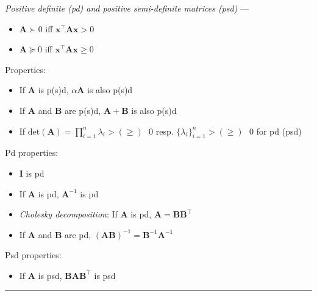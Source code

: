 \emph{Positive definite (pd) and positive semi-definite matrices (psd)} --- 
\begin{multicols}{2}
\begin{itemize}
    \item $\boldsymbol{A} \succ 0$ iff $\boldsymbol{x}^\intercal\boldsymbol{A}\boldsymbol{x} > 0$
    \item $\boldsymbol{A} \succeq 0$ iff $\boldsymbol{x}^\intercal\boldsymbol{A}\boldsymbol{x} \geq 0$
\end{itemize}
\end{multicols}
Properties:
\begin{itemize}
    \item If $\boldsymbol{A}$ is p(s)d, $\alpha\boldsymbol{A}$ is also p(s)d
    \item If $\boldsymbol{A}$ and $\boldsymbol{B}$ are p(s)d, $\boldsymbol{A} + \boldsymbol{B}$ is also p(s)d
    \item If $\textrm{det}(\boldsymbol{A}) = \prod_{i=1}^n \lambda_i > (\geq) \textrm{ } 0$ resp. $\{\lambda_i\}_{i=1}^n > (\geq) \textrm{ } 0$ for pd (psd)
\end{itemize}
Pd properties:
\begin{itemize}
    \item $\boldsymbol{I}$ is pd
    \item If $\boldsymbol{A}$ is pd, $\boldsymbol{A}^{-1}$ is pd
    \item \emph{Cholesky decomposition}: If $\boldsymbol{A}$ is pd, $\boldsymbol{A} = \boldsymbol{B}\boldsymbol{B}^\intercal$
    \item If $\boldsymbol{A}$ and $\boldsymbol{B}$ are pd, $(\boldsymbol{A}\boldsymbol{B})^{-1} = \boldsymbol{B}^{-1}\boldsymbol{A}^{-1}$
\end{itemize}
Psd properties:
\begin{itemize}
    \item If $\boldsymbol{A}$ is psd, $\boldsymbol{B}\boldsymbol{A}\boldsymbol{B}^\intercal$ is psd
\end{itemize}

{\color{black}\hrule height 0.001mm}

